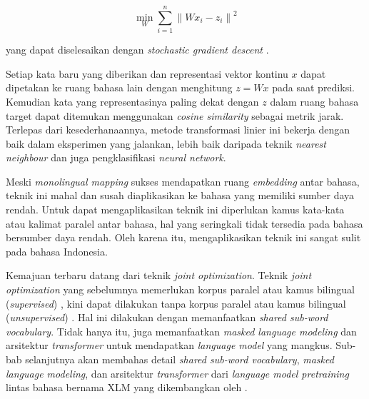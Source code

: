     \begin{equation}
        \min_{W}\sum_{i=1}^{n}\left \| Wx_i-z_i \right \|^2
        \label{eq:2}
    \end{equation}

    yang dapat diselesaikan dengan \textit{stochastic gradient descent} \parencite{MikolovExploiting}.

    Setiap kata baru yang diberikan dan representasi vektor kontinu \(x\) dapat dipetakan ke ruang bahasa lain dengan menghitung \(z = W x\) pada saat prediksi. Kemudian kata yang representasinya paling dekat dengan \(z\) dalam ruang bahasa target dapat ditemukan menggunakan \textit{cosine similarity} sebagai metrik jarak. Terlepas dari kesederhanaannya, metode transformasi linier ini bekerja dengan baik dalam eksperimen yang \parencite{MikolovExploiting} jalankan, lebih baik daripada teknik \textit{nearest neighbour} dan juga pengklasifikasi \textit{neural network}.

    Meski \textit{monolingual mapping} sukses mendapatkan ruang \textit{embedding} antar bahasa, teknik ini mahal dan susah diaplikasikan ke bahasa yang memiliki sumber daya rendah. Untuk dapat mengaplikasikan teknik ini diperlukan kamus kata-kata atau kalimat paralel antar bahasa, hal yang seringkali tidak tersedia pada bahasa bersumber daya rendah. Oleh karena itu, mengaplikasikan teknik ini sangat sulit pada bahasa Indonesia. 

    Kemajuan terbaru datang dari teknik \textit{joint optimization}. Teknik \textit{joint optimization} yang sebelumnya memerlukan korpus paralel atau kamus bilingual (\textit{supervised}) \parencite{Xing_Wang_Liu_Lin}, kini dapat dilakukan tanpa korpus paralel atau kamus bilingual (\textit{unsupervised}) \parencite{LampleConneau2019}. Hal ini dilakukan dengan memanfaatkan \textit{shared sub-word vocabulary}. Tidak hanya itu, \parencite{LampleConneau2019} juga memanfaatkan \textit{masked language modeling} dan arsitektur \textit{transformer} untuk mendapatkan \textit{language model} yang mangkus. Sub-bab selanjutnya akan membahas detail \textit{shared sub-word vocabulary}, \textit{masked language modeling}, dan arsitektur \textit{transformer} dari \textit{language model pretraining} lintas bahasa bernama XLM yang dikembangkan oleh \parencite{LampleConneau2019}.

